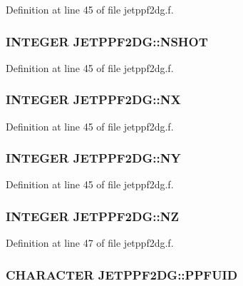 Definition at line 45 of file jetppf2dg.f.\hypertarget{namespaceJETPPF2DG_e270735b1159e8e19c3b3c52b0bb3d51}{
\subsubsection[NSHOT]{\setlength{\rightskip}{0pt plus 5cm}INTEGER {\bf JETPPF2DG::NSHOT}}}
\label{namespaceJETPPF2DG_e270735b1159e8e19c3b3c52b0bb3d51}




Definition at line 45 of file jetppf2dg.f.\hypertarget{namespaceJETPPF2DG_a57c322f474d9c8344c098ffb1f2fbbc}{
\subsubsection[NX]{\setlength{\rightskip}{0pt plus 5cm}INTEGER {\bf JETPPF2DG::NX}}}
\label{namespaceJETPPF2DG_a57c322f474d9c8344c098ffb1f2fbbc}




Definition at line 45 of file jetppf2dg.f.\hypertarget{namespaceJETPPF2DG_fe7c59a5845e1d14c352d47c802827bb}{
\subsubsection[NY]{\setlength{\rightskip}{0pt plus 5cm}INTEGER {\bf JETPPF2DG::NY}}}
\label{namespaceJETPPF2DG_fe7c59a5845e1d14c352d47c802827bb}




Definition at line 45 of file jetppf2dg.f.\hypertarget{namespaceJETPPF2DG_54b52cca10f228100e5bf6d6861b5744}{
\subsubsection[NZ]{\setlength{\rightskip}{0pt plus 5cm}INTEGER {\bf JETPPF2DG::NZ}}}
\label{namespaceJETPPF2DG_54b52cca10f228100e5bf6d6861b5744}




Definition at line 47 of file jetppf2dg.f.\hypertarget{namespaceJETPPF2DG_48577f770d2731f2e0b6560b4098131b}{
\subsubsection[PPFUID]{\setlength{\rightskip}{0pt plus 5cm}CHARACTER {\bf JETPPF2DG::PPFUID}}}
\label{namespaceJETPPF2DG_48577f770d2731f2e0b6560b4098131b}




